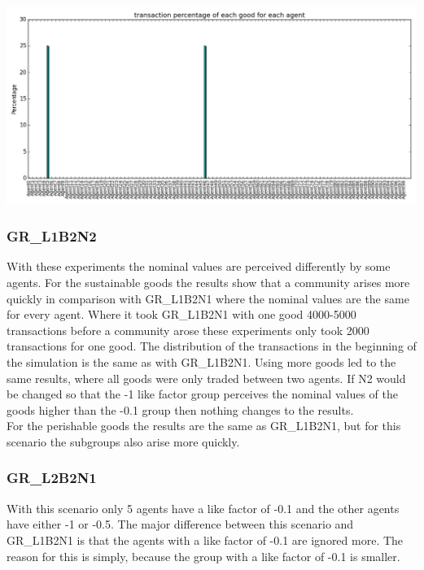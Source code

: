 \documentclass[twoside,openright]{uva-bachelor-thesis}
\begin{document}
\includegraphics[scale=0.4]{GR_L1B2N1/2k_2perishable}


\subsubsection{GR\_L1B2N2}
With these experiments the nominal values are perceived differently by some agents. For the sustainable goods the results show that a community arises more quickly in comparison with GR\_L1B2N1 where the nominal values are the same for every agent. Where it took GR\_L1B2N1 with one good 4000-5000 transactions before a community arose these experiments only took 2000 transactions for one good. The distribution of the transactions in the beginning of the simulation is the same as with GR\_L1B2N1. Using more goods led to the same results, where all goods were only traded between two agents. If N2 would be changed so that the -1 like factor group perceives the nominal values of the goods higher than the -0.1 group then nothing changes to the results.
\\
For the perishable goods the results are the same as GR\_L1B2N1, but for this scenario the subgroups also arise more quickly.
\subsubsection{GR\_L2B2N1}
With this scenario only 5 agents have a like factor of -0.1 and the other agents have either -1 or -0.5. The major difference between this scenario and GR\_L1B2N1 is that the agents with a like factor of -0.1 are ignored more. The reason for this is simply, because the group with a like factor of -0.1 is smaller.
\end{document}
